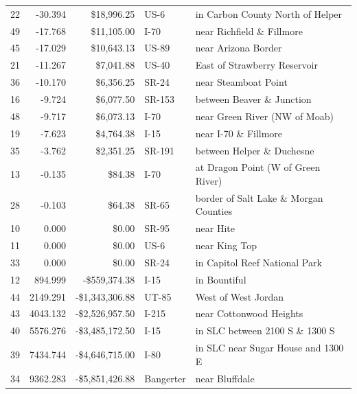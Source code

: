 \begin{table}
\begin{tabular}[t]{crrll}
22 & -30.394 & \$18,996.25 & US-6 & in Carbon County North of Helper\\
49 & -17.768 & \$11,105.00 & I-70 & near Richfield \& Fillmore\\
45 & -17.029 & \$10,643.13 & US-89 & near Arizona Border\\
21 & -11.267 & \$7,041.88 & US-40 & East of Strawberry Reservoir\\
36 & -10.170 & \$6,356.25 & SR-24 & near Steamboat Point\\
16 & -9.724 & \$6,077.50 & SR-153 & between Beaver \& Junction\\
48 & -9.717 & \$6,073.13 & I-70 & near Green River (NW of Moab)\\
19 & -7.623 & \$4,764.38 & I-15 & near I-70 \& Fillmore\\
35 & -3.762 & \$2,351.25 & SR-191 & between Helper \& Duchesne\\
13 & -0.135 & \$84.38 & I-70 & at Dragon Point (W of Green River)\\
28 & -0.103 & \$64.38 & SR-65 & border of Salt Lake \& Morgan Counties\\
10 & 0.000 & \$0.00 & SR-95 & near Hite\\
11 & 0.000 & \$0.00 & US-6 & near King Top\\
33 & 0.000 & \$0.00 & SR-24 & in Capitol Reef National Park\\
12 & 894.999 & -\$559,374.38 & I-15 & in Bountiful\\
44 & 2149.291 & -\$1,343,306.88 & UT-85 & West of West Jordan\\
43 & 4043.132 & -\$2,526,957.50 & I-215 & near Cottonwood Heights\\
40 & 5576.276 & -\$3,485,172.50 & I-15 & in SLC between 2100 S \& 1300 S\\
39 & 7434.744 & -\$4,646,715.00 & I-80 & in SLC near Sugar House and 1300 E\\
34 & 9362.283 & -\$5,851,426.88 & Bangerter & near Bluffdale\\
\bottomrule
\end{tabular}
\end{table}

